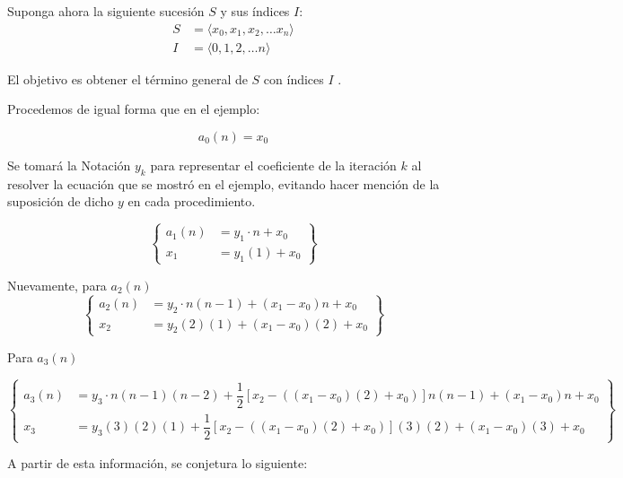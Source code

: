 
Suponga ahora la siguiente sucesión $S$ y sus índices $I$:
\begin{align*}
    S &= \langle x_0, x_1, x_2, \dots x_n\rangle\\
    I &= \langle 0, 1, 2, \dots n \rangle
\end{align*}

El objetivo es obtener el término general de $S$ con índices $I$ .

Procedemos de igual forma que en el ejemplo:

\[a_0(n) = x_0\]

Se tomará la Notación $y_k$ para representar el coeficiente de la iteración $k$ al resolver la ecuación que se mostró en el ejemplo, evitando hacer mención de la suposición de dicho $y$ en cada procedimiento.

\begin{equation*}
    \left\{
        \begin{aligned}
            a_1(n) &= y_1 \cdot n + x_0\\
            x_1 &= y_1(1) + x_0
        \end{aligned}
    \right\}
\end{equation*}

Nuevamente, para $a_2(n)$
\begin{equation*}
    \left\{
        \begin{aligned}
            a_2(n) &= y_2 \cdot n(n-1) + (x_1 - x_0)n + x_0\\
            x_2 &= y_2(2)(1) + (x_1 - x_0)(2) + x_0
        \end{aligned}  
    \right\}
\end{equation*}

Para $a_3(n)$

\begin{equation*}
    \left\{
        \begin{aligned}
            a_3(n) &= y_3 \cdot n(n-1)(n-2) + \dfrac{1}{2}[x_2 - ((x_1  - x_0)(2) + x_0)]n(n-1) + (x_1 - x_0)n + x_0\\
            x_3 &= y_3 (3)(2)(1) + \dfrac{1}{2}[x_2 - ((x_1  - x_0)(2) + x_0)](3)(2) + (x_1 - x_0)(3) + x_0
        \end{aligned}
    \right\}
\end{equation*}

A partir de esta información, se conjetura lo siguiente:

